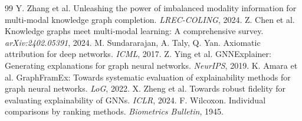 \documentclass[12pt, a4paper]{article}
\begin{document}
\begin{thebibliography}{99}
 Y. Zhang et al. Unleashing the power of imbalanced modality information for multi-modal knowledge graph completion. \textit{LREC-COLING}, 2024.
 Z. Chen et al. Knowledge graphs meet multi-modal learning: A comprehensive survey. \textit{arXiv:2402.05391}, 2024.
 M. Sundararajan, A. Taly, Q. Yan. Axiomatic attribution for deep networks. \textit{ICML}, 2017.
 Z. Ying et al. GNNExplainer: Generating explanations for graph neural networks. \textit{NeurIPS}, 2019.
 K. Amara et al. GraphFramEx: Towards systematic evaluation of explainability methods for graph neural networks. \textit{LoG}, 2022.
 X. Zheng et al. Towards robust fidelity for evaluating explainability of GNNs. \textit{ICLR}, 2024.
 F. Wilcoxon. Individual comparisons by ranking methods. \textit{Biometrics Bulletin}, 1945.
\end{thebibliography}
\end{document}
